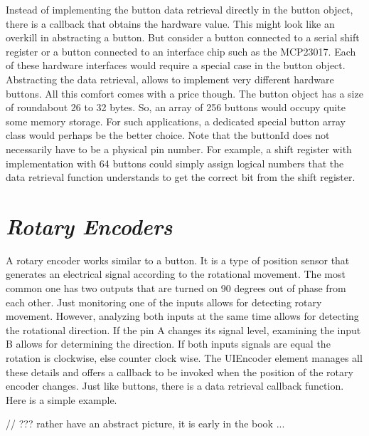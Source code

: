 Instead of implementing the button data retrieval directly in the button object, there is a callback that obtains the hardware value. This might look like an overkill in abstracting a button. But consider a button connected to a serial shift register or a button connected to an interface chip such as the MCP23017. Each of these hardware interfaces would require a special case in the button object. Abstracting the data retrieval, allows to implement very different hardware buttons. All this comfort comes with a price though. The button object has a size of roundabout 26 to 32 bytes. So, an array of 256 buttons would occupy quite some memory storage. For such applications, a dedicated special button array class would perhaps be the better choice. Note that the buttonId does not necessarily have to be a physical pin number. For example, a shift register with implementation with 64 buttons could simply assign logical numbers that the data retrieval function understands to get the correct bit from the shift register.

\section{\textit{Rotary Encoders}}

A rotary encoder works similar to a button. It is a type of position sensor that generates an electrical signal according to the rotational movement. The most common one has two outputs that are turned on 90 degrees out of phase from each other. Just monitoring one of the inputs allows for detecting rotary movement. However, analyzing both inputs at the same time allows for detecting the rotational direction. If the pin A changes its signal level, examining the input B allows for determining the direction. If both inputs signals are equal the rotation is clockwise, else counter clock wise. The UIEncoder element manages all these details and offers a callback to be invoked when the position of the rotary encoder changes. Just like buttons, there is a data retrieval callback function. Here is a simple example.

// ??? rather have an abstract picture, it is early in the book ...


